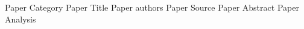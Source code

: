 \documentclass{report}
\begin{document}
    
    
    \vspace{1cm}
    \vspace{1cm}
    
    \makepapersummery
      {Paper Category}
      {Paper Title \cite{example_reference}}
      {Paper authors}
      {Paper Source}
      {Paper Abstract}
      {Paper Analysis}
    
    \printbibliography
\end{document}

